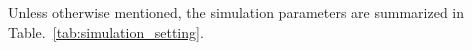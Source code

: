 \documentclass[journal]{IEEEtran}
\newcommand{\ie}[0]{\textit{i.e.}}
\newcommand{\sigman}[0]{\sigma_{\text{n}}}
\begin{document}


Unless otherwise mentioned, the simulation parameters are summarized in Table.~\ref{tab:simulation_setting}.
\end{document}
